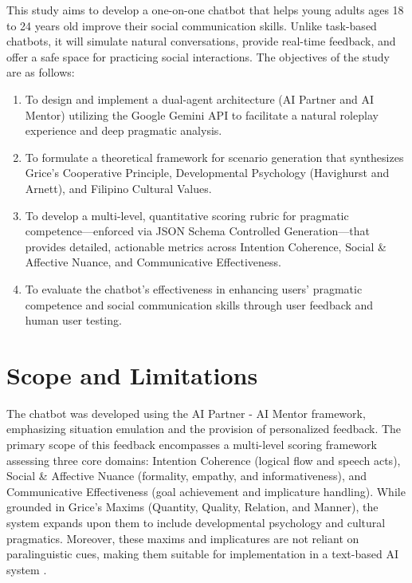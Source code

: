 \indent This study aims to develop a one-on-one chatbot that helps young adults ages 18 to 24 years old improve their social communication skills. 
Unlike task-based chatbots, it will simulate natural conversations, provide real-time feedback, and offer a safe space for practicing social interactions. 
The objectives of the study are as follows:

\begin{enumerate}
    \item To design and implement a dual-agent architecture (AI Partner and AI Mentor) utilizing the Google Gemini API to facilitate a natural roleplay experience and deep pragmatic analysis.
    \item To formulate a theoretical framework for scenario generation that synthesizes Grice's Cooperative Principle, Developmental Psychology (Havighurst and Arnett), and Filipino Cultural Values.
    \item To develop a multi-level, quantitative scoring rubric for pragmatic competence—enforced via JSON Schema Controlled Generation—that provides detailed, actionable metrics across Intention Coherence, Social \& Affective Nuance, and Communicative Effectiveness.
    \item To evaluate the chatbot's effectiveness in enhancing users' pragmatic competence and social communication skills through user feedback and human user testing.
\end{enumerate}

\section{Scope and Limitations}
\indent The chatbot was developed using the AI Partner - AI Mentor framework, emphasizing situation emulation and the provision of personalized feedback. 
The primary scope of this feedback encompasses a multi-level scoring framework assessing three core domains: Intention Coherence (logical flow and speech acts), 
Social \& Affective Nuance (formality, empathy, and informativeness), and Communicative Effectiveness (goal achievement and implicature handling). While grounded in 
Grice's Maxims (Quantity, Quality, Relation, and Manner), the system expands upon them to include developmental psychology and cultural pragmatics. Moreover, these 
maxims and implicatures are not reliant on paralinguistic cues, making them suitable for implementation in a text-based AI system \cite{dale_role_1996}. 

